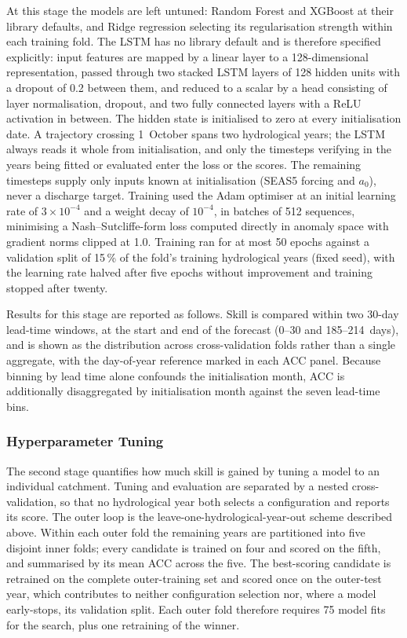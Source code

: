 \documentclass[review,12pt,authoryear]{elsarticle}
\begin{document}
At this stage the models are left untuned: Random Forest and XGBoost at their library defaults, and Ridge regression selecting its regularisation strength within each training fold. The LSTM has no library default and is therefore specified explicitly: input features are mapped by a linear layer to a 128-dimensional representation, passed through two stacked LSTM layers of 128 hidden units with a dropout of 0.2 between them, and reduced to a scalar by a head consisting of layer normalisation, dropout, and two fully connected layers with a ReLU activation in between. The hidden state is initialised to zero at every initialisation date. A trajectory crossing 1~October spans two hydrological years; the LSTM always reads it whole from initialisation, and only the timesteps verifying in the years being fitted or evaluated enter the loss or the scores. The remaining timesteps supply only inputs known at initialisation (SEAS5 forcing and $a_{0}$), never a discharge target. Training used the Adam optimiser at an initial learning rate of $3\times10^{-4}$ and a weight decay of $10^{-4}$, in batches of 512 sequences, minimising a Nash--Sutcliffe-form loss computed directly in anomaly space with gradient norms clipped at 1.0. Training ran for at most 50 epochs against a validation split of 15\,\% of the fold's training hydrological years (fixed seed), with the learning rate halved after five epochs without improvement and training stopped after twenty.

Results for this stage are reported as follows. Skill is compared within two 30-day lead-time windows, at the start and end of the forecast (0--30 and 185--214~days), and is shown as the distribution across cross-validation folds rather than a single aggregate, with the day-of-year reference marked in each ACC panel. Because binning by lead time alone confounds the initialisation month, ACC is additionally disaggregated by initialisation month against the seven lead-time bins.

  \subsubsection{Hyperparameter Tuning}

The second stage quantifies how much skill is gained by tuning a model to an individual catchment. Tuning and evaluation are separated by a nested cross-validation, so that no hydrological year both selects a configuration and reports its score. The outer loop is the leave-one-hydrological-year-out scheme described above. Within each outer fold the remaining years are partitioned into five disjoint inner folds; every candidate is trained on four and scored on the fifth, and summarised by its mean ACC across the five. The best-scoring candidate is retrained on the complete outer-training set and scored once on the outer-test year, which contributes to neither configuration selection nor, where a model early-stops, its validation split. Each outer fold therefore requires 75 model fits for the search, plus one retraining of the winner.
\end{document}
